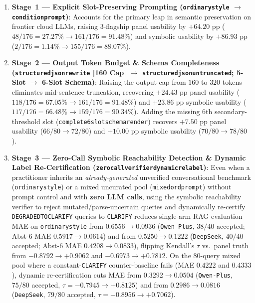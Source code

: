 \documentclass[10pt,twocolumn]{article}
\renewcommand{\_}{\textunderscore\allowbreak}
\begin{document}
\begin{enumerate}[leftmargin=*,nosep]
  \item \textbf{Stage~1 --- Explicit Slot-Preserving Prompting (\texttt{ordinary\_style} $\to$ \texttt{condition\_prompt})}: Accounts for the primary leap in semantic preservation on frontier cloud LLMs, raising 3-flagship panel usability by \textbf{$+64.20\text{ pp}$} ($48/176 = 27.27\% \to 161/176 = 91.48\%$) and symbolic usability by \textbf{$+86.93\text{ pp}$} ($2/176 = 1.14\% \to 155/176 = 88.07\%$).
  \item \textbf{Stage~2 --- Output Token Budget \& Schema Completeness (\texttt{structured\_json\_rewrite} [160 Cap] $\to$ \texttt{structured\_json\_untruncated\_320}; 5-Slot $\to$ 6-Slot Schema)}: Raising the output cap from $160$ to $320$ tokens eliminates mid-sentence truncation, recovering \textbf{$+24.43\text{ pp}$} panel usability ($118/176 = 67.05\% \to 161/176 = 91.48\%$) and \textbf{$+23.86\text{ pp}$} symbolic usability ($117/176 = 66.48\% \to 159/176 = 90.34\%$). Adding the missing 6th secondary-threshold slot (\texttt{complete\_6slot\_schema\_render}) recovers $+7.50\text{ pp}$ panel usability ($66/80 \to 72/80$) and $+10.00\text{ pp}$ symbolic usability ($70/80 \to 78/80$).
  \item \textbf{Stage~3 --- Zero-Call Symbolic Reachability Detection \& Dynamic Label Re-Certification (\texttt{zero\_call\_verifier\_dynamic\_relabel})}: Even when a practitioner inherits an \emph{already-generated} unverified conversational benchmark (\texttt{ordinary\_style}) or a mixed uncurated pool (\texttt{mixed\_ord\_prompt\_80}) without prompt control and with \textbf{zero LLM calls}, using the symbolic reachability verifier to reject mutated/parse-uncertain queries and dynamically re-certify \texttt{DEGRADED\_TO\_CLARIFY} queries to \texttt{CLARIFY} reduces single-arm RAG evaluation MAE on \texttt{ordinary\_style} from \textbf{$0.6556 \to 0.0936$} (\texttt{Qwen-Plus}, $38/40$ accepted; Abst-6 MAE $0.5917 \to 0.0614$) and from \textbf{$0.5250 \to 0.1222$} (\texttt{DeepSeek}, $40/40$ accepted; Abst-6 MAE $0.4208 \to 0.0833$), flipping Kendall's $\tau$ vs.\ panel truth from \textbf{$-0.8792 \to +0.9062$} and \textbf{$-0.6973 \to +0.7812$}. On the 80-query mixed pool where a constant-\texttt{CLARIFY} counter-baseline fails (MAE $0.4222$ and $0.4333$), dynamic re-certification cuts MAE from \textbf{$0.3292 \to 0.0504$} (\texttt{Qwen-Plus}, $75/80$ accepted, $\tau = -0.7945 \to +0.8125$) and from \textbf{$0.2986 \to 0.0816$} (\texttt{DeepSeek}, $79/80$ accepted, $\tau = -0.8956 \to +0.7062$).

\end{enumerate}
\end{document}
